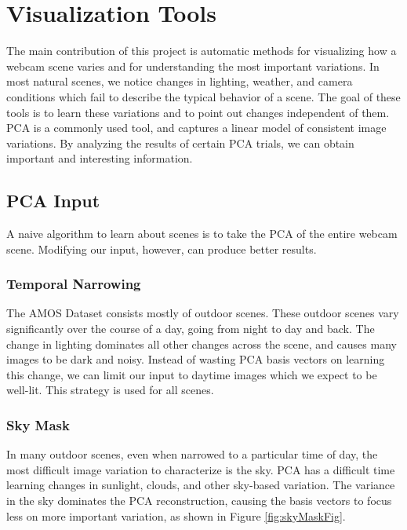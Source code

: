 \chapter{Visualization Tools}
\label{cpt:tools}

The main contribution of this project is automatic methods for visualizing how a webcam scene varies and for understanding the most important variations.  In most natural scenes, we notice changes in lighting, weather, and camera conditions which fail to describe the typical behavior of a scene.  The goal of these tools is to learn these variations and to point out changes independent of them.  PCA is a commonly used tool, and
captures a linear model of consistent image variations.  By analyzing the results of certain PCA trials, we can obtain important and interesting information.

\section{PCA Input}

A naive algorithm to learn about scenes is to take the PCA of the entire webcam scene.  Modifying our input, however, can produce better results.

\subsection{Temporal Narrowing}

The AMOS Dataset consists mostly of outdoor scenes.  These outdoor scenes vary significantly over the course of a day, going from night to day and back.  The change in lighting dominates all other changes across the scene, and causes many images to be dark and noisy.  Instead of wasting PCA basis vectors on learning this change, we can limit our input to daytime images which we expect to be well-lit.  This strategy is used for all scenes.

\subsection{Sky Mask}
In many outdoor scenes, even when narrowed to a particular time of day, the most difficult image variation to characterize is the sky.  PCA has a difficult time learning changes in sunlight, clouds,
and other sky-based variation.  The variance in the sky dominates the PCA reconstruction, causing the basis vectors to focus less on more important variation, as shown in Figure \ref{fig:skyMaskFig}.

